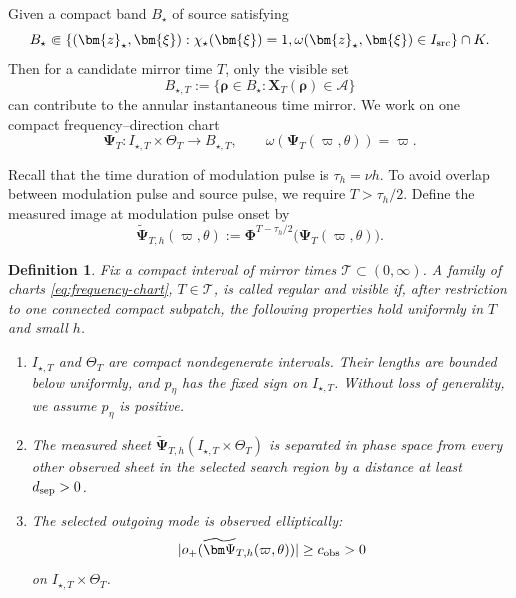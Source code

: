 \documentclass[11pt,reqno]{amsart}
\newtheorem{definition}{Definition}[section]
\numberwithin{equation}{section}
\begin{document}
Given a compact band $B_\star$ of source satisfying
$$
    B_\star\Subset\{(\bm{z}_\star,\bm{\xi}):\chi_\star(\bm{\xi})=1, \omega(\bm{z}_\star,\bm{\xi})\in I_{\rm src}\}\cap K.
$$
Then for a candidate mirror time $T$, only the visible set
$$
    B_{\star,T}:=\{\bm{\rho}\in B_\star:\bm X_T(\bm{\rho})\in\mathcal A\}
$$
can contribute to the annular instantaneous time mirror. We work on one compact frequency--direction chart
\begin{equation}\label{eq:frequency-chart}
    \bm\Psi_T:I_{\star,T}\times\Theta_T\longrightarrow B_{\star,T}, \qquad \omega(\bm\Psi_T(\varpi,\theta))=\varpi.
\end{equation}

Recall that the time duration of modulation pulse is $\tau_h=\nu h$. To avoid overlap between modulation pulse and source pulse, we require $T>\tau_h/2$. Define the measured image at modulation pulse onset by
$$
    \widetilde{\bm\Psi}_{T,h}(\varpi,\theta):=\bm\Phi^{T-\tau_h/2}\bigl(\bm\Psi_T(\varpi,\theta)\bigr).
$$

\begin{definition}\label{def:visible-chart}
Fix a compact interval of mirror times $\mathcal T\subset(0,\infty)$. A family of charts \eqref{eq:frequency-chart}, $T\in\mathcal T$, is called \emph{regular and visible} if, after restriction to one connected compact subpatch, the following properties hold uniformly in $T$ and small $h$. \begin{enumerate}[label=\textnormal{(\roman*)}]
\item $I_{\star,T}$ and $\Theta_T$ are compact nondegenerate intervals. Their lengths are bounded below uniformly, and $p_\eta$ has the fixed sign on $I_{\star,T}$. Without loss of generality, we assume $p_\eta$ is positive.
\item The measured sheet $\widetilde{\bm\Psi}_{T,h}(I_{\star,T}\times\Theta_T)$ is separated in phase space from every other observed sheet in the selected search region by a distance at least $d_{\rm sep}>0$.
\item The selected outgoing mode is observed elliptically:
\begin{equation}\label{eq:observation-ellipticity}
    |o_+(\widetilde{\bm\Psi}_{T,h}(\varpi,\theta))|\geq c_{\rm obs}>0
\end{equation}
on $I_{\star,T}\times\Theta_T$.
\end{enumerate}
\end{definition}
\end{document}

